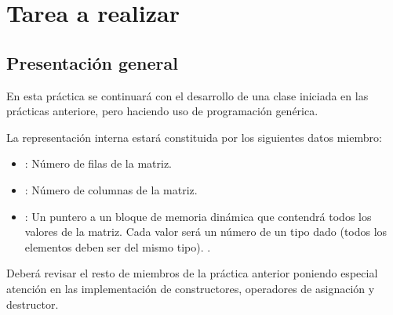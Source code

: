 \section{Tarea a realizar}

\subsection{Presentación general}

En esta práctica se continuará con el desarrollo de una clase 
iniciada en las prácticas anteriore, 
pero haciendo uso de programación genérica.

La representación interna estará constituida por los siguientes datos miembro:

\begin{itemize}
\item {}: Número de filas de la matriz.
\item {}: Número de columnas de la matriz.
\item {}: Un puntero a un bloque de memoria dinámica que contendrá
todos los valores de la matriz. 
Cada valor será un número de un tipo dado 
(todos los elementos deben ser del mismo tipo).
.
\end{itemize}

Deberá revisar el resto de miembros de la práctica anterior poniendo
especial atención en las implementación de constructores, operadores de
asignación y destructor.

